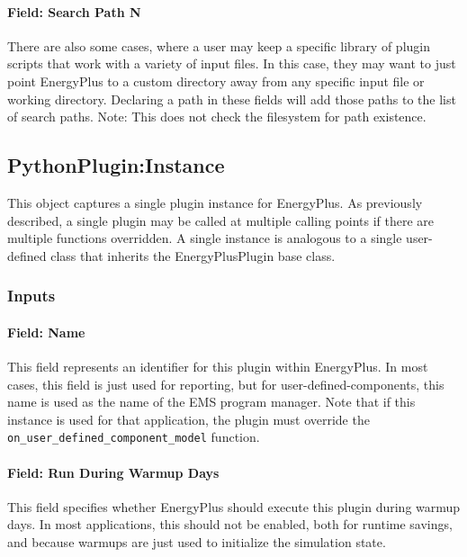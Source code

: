 \paragraph{Field: Search Path N}

There are also some cases, where a user may keep a specific library of plugin scripts that work with a variety of input files.
In this case, they may want to just point EnergyPlus to a custom directory away from any specific input file or working directory.
Declaring a path in these fields will add those paths to the list of search paths.
Note: This does not check the filesystem for path existence.

\subsection{PythonPlugin:Instance}

This object captures a single plugin instance for EnergyPlus.
As previously described, a single plugin may be called at multiple calling points if there are multiple functions overridden.
A single instance is analogous to a single user-defined class that inherits the EnergyPlusPlugin base class.

\subsubsection{Inputs}

\paragraph{Field: Name}

This field represents an identifier for this plugin within EnergyPlus.
In most cases, this field is just used for reporting, but for user-defined-components, this name is used as the name of the EMS program manager.
Note that if this instance is used for that application, the plugin must override the \verb=on_user_defined_component_model= function.

\paragraph{Field: Run During Warmup Days}

This field specifies whether EnergyPlus should execute this plugin during warmup days.
In most applications, this should not be enabled, both for runtime savings, and because warmups are just used to initialize the simulation state.

